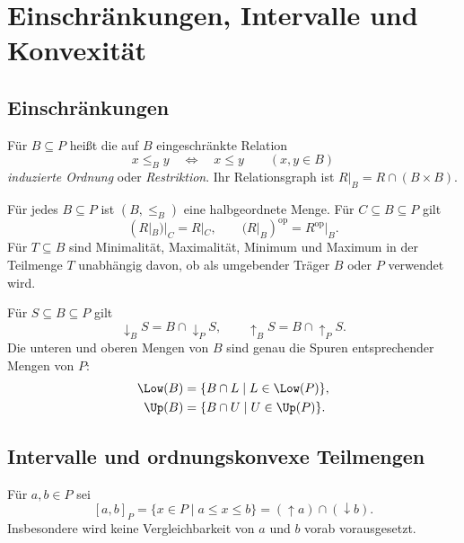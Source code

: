 \chapter{Einschränkungen, Intervalle und Konvexität}
\label{b12guide:ch:subsets}

\section{Einschränkungen}

\begin{definition}
\label{b12guide:def:restriction}
Für $B\subseteq P$ heißt die auf $B$ eingeschränkte Relation
\[
 x\leq_B y\quad\Longleftrightarrow\quad x\leq y
 \qquad(x,y\in B)
\]
\emph{induzierte Ordnung} oder \emph{Restriktion}.
Ihr Relationsgraph ist $R|_B=R\cap(B\times B)$.
\end{definition}

\begin{theorem}
\label{b12guide:thm:restriction}
Für jedes $B\subseteq P$ ist $(B,\leq_B)$ eine halbgeordnete Menge.
Für $C\subseteq B\subseteq P$ gilt
\[
 (R|_B)|_C=R|_C,
 \qquad (R|_B)^{\mathrm{op}}=R^{\mathrm{op}}|_B.
\]
Für $T\subseteq B$ sind Minimalität, Maximalität, Minimum und
Maximum in der Teilmenge $T$ unabhängig davon, ob als umgebender
Träger $B$ oder $P$ verwendet wird.
\end{theorem}

\begin{theorem}
\label{b12guide:thm:relative-closures}
Für $S\subseteq B\subseteq P$ gilt
\[
 \downarrow_B S=B\cap\downarrow_P S,\qquad
 \uparrow_B S=B\cap\uparrow_P S.
\]
Die unteren und oberen Mengen von $B$ sind genau die Spuren
entsprechender Mengen von $P$:
\[
\begin{aligned}
 \Low(B)&=\{B\cap L\mid L\in\Low(P)\},\\
 \Up(B)&=\{B\cap U\mid U\in\Up(P)\}.
\end{aligned}
\]
\end{theorem}

\section{Intervalle und ordnungskonvexe Teilmengen}

\begin{definition}
\label{b12guide:def:interval}
Für $a,b\in P$ sei
\[
 [a,b]_P=\{x\in P\mid a\leq x\leq b\}
         =(\uparrow a)\cap(\downarrow b).
\]
Insbesondere wird keine Vergleichbarkeit von $a$ und $b$
vorab vorausgesetzt.
\end{definition}

